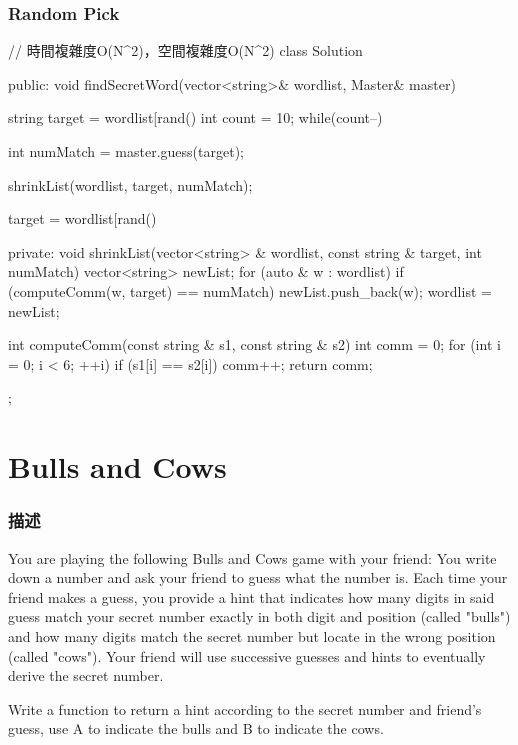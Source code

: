 \subsubsection{Random Pick}
\begin{Code}
// 時間複雜度O(N^2)，空間複雜度O(N^2)
class Solution {
public:
    void findSecretWord(vector<string>& wordlist, Master& master) {

        string target = wordlist[rand() %
        int count = 10;
        while(count--) {
            int numMatch = master.guess(target);

            shrinkList(wordlist, target, numMatch);

            target = wordlist[rand() %
        }
    }

private:
    void shrinkList(vector<string> & wordlist, const string & target, int numMatch) {
        vector<string> newList;
        for (auto & w : wordlist) {
            if (computeComm(w, target) == numMatch) {
                newList.push_back(w);
            }
        }
        wordlist = newList;
    }

    int computeComm(const string & s1, const string & s2) {
        int comm = 0;
        for (int i = 0; i < 6; ++i) {
            if (s1[i] == s2[i]) comm++;
        }
        return comm;
    }

};
\end{Code}

\section{Bulls and Cows} %
\label{sec:bulls-and-cows}

\subsubsection{描述}
You are playing the following Bulls and Cows game with your friend: You write down a number and ask your friend to guess what the number is. Each time your friend makes a guess, you provide a hint that indicates how many digits in said guess match your secret number exactly in both digit and position (called "bulls") and how many digits match the secret number but locate in the wrong position (called "cows"). Your friend will use successive guesses and hints to eventually derive the secret number.

Write a function to return a hint according to the secret number and friend's guess, use A to indicate the bulls and B to indicate the cows. 

